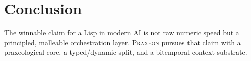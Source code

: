 \documentclass[11pt,a4paper]{article}
\begin{document}
\section{Conclusion}
\label{sec:conclusion}
The winnable claim for a Lisp in modern AI is not raw numeric speed but a
principled, malleable orchestration layer. \textsc{Praxeon} pursues that claim
with a praxeological core, a typed/dynamic split, and a bitemporal context
substrate.



\end{document}
